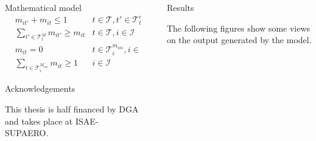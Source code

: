 \documentclass[final]{beamer}
\newlength{\sepwid}
\newlength{\onecolwid}
\newlength{\twocolwid}
\begin{document}
\begin{frame}[t]
\begin{columns}[t]
\begin{column}{\twocolwid}
\begin{columns}[t,totalwidth=\twocolwid]
\begin{column}{\twocolwid}
\begin{block}{Mathematical model}
\begin{align*}
			        & m_{it'} + m_{it} \leq 1
			          & t \in \mathcal{T}, t' \in \mathcal{T}^{m}_t, i \in \mathcal{I}\\ 
			        & \sum_{t' \in \mathcal{T}^{M}_t} m_{it'} \geq  m_{it}
			          & t \in \mathcal{T}, i \in \mathcal{I}\\
			        & m_{it} = 0
			          & t \in \mathcal{T}^{m_{ini}}_i, i \in \mathcal{I} \\
			        & \sum_{t \in \mathcal{T}^{M_{ini}}_i} m_{it} \geq  1 
			          & i \in \mathcal{I}
			    \end{align*}

			\end{block}


			\begin{alertblock}{Acknowledgements}
					
				This thesis is half financed by DGA and takes place at ISAE-SUPAERO.

			\end{alertblock}

		\end{column} %

		\end{columns} %

	\end{column} %



	\begin{column}{\sepwid}\end{column} %

	\begin{column}{\onecolwid} %


			\begin{block}{Results}

				The following figures show some views on the output generated by the model.


\end{block}
\end{column}
\end{columns}
\end{frame}
\end{document}
